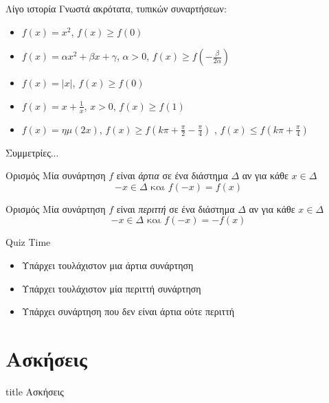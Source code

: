 \documentclass{presentation}
\begin{document}
\begin{frame}{Λίγο ιστορία}
  Γνωστά ακρότατα, τυπικών συναρτήσεων:
  \begin{itemize}
    \item $f(x)=x^2$\pause, $f(x)\ge f(0)$ \pause
    \item $f(x)=αx^2+βx+γ$, $α>0$\pause, $f(x)\ge f(-\frac{β}{2α})$ \pause
    \item $f(x)=|x|$\pause, $f(x)\ge f(0)$ \pause
    \item $f(x)=x+\frac{1}{x}$, $x>0$\pause, $f(x)\ge f(1)$
    \item $f(x)=ημ(2x)$\pause, $f(x)\ge f(k\pi + \frac{\pi}{2} - \frac{\pi}{4})$ \pause, $f(x)\le f(k\pi + \frac{\pi}{4})$
  \end{itemize}
\end{frame}

\begin{frame}{Συμμετρίες...}
  \begin{block}{Ορισμός}
    Μία συνάρτηση $f$ είναι \emph{άρτια} σε ένα διάστημα $Δ$ αν για κάθε  $ x\in Δ$
    $$-x\in Δ \text{ και } f(-x)=f(x)$$
  \end{block} \pause
  \begin{block}{Ορισμός}
    Μία συνάρτηση $f$ είναι \emph{περιττή} σε ένα διάστημα $Δ$ αν για κάθε  $ x\in Δ$
    $$-x\in Δ \text{ και } f(-x)=-f(x)$$
  \end{block}
\end{frame}

\begin{frame}{Quiz Time}
  \begin{itemize}
    \item Υπάρχει τουλάχιστον μια άρτια συνάρτηση \pause
    \item Υπάρχει τουλάχιστον μία περιττή συνάρτηση \pause
    \item Υπάρχει συνάρτηση που δεν είναι άρτια ούτε περιττή
  \end{itemize}
\end{frame}


\section{Ασκήσεις}

\begin{frame}[noframenumbering]
  \vfill
  \centering
  \begin{beamercolorbox}[sep=8pt,center,shadow=true,rounded=true]{title}
    Ασκήσεις
  \end{beamercolorbox}
  \vfill
\end{frame}
\end{document}
